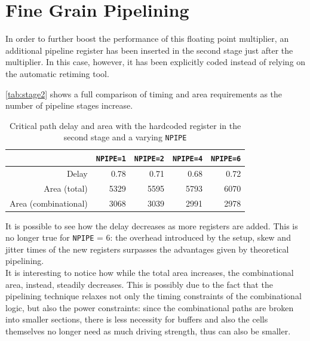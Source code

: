 \section{Fine Grain Pipelining}
In order to further boost the performance of this floating point multiplier, an additional pipeline register has been inserted in the second stage just after the multiplier. In this case, however, it has been explicitly coded instead of relying on the automatic retiming tool.

\autoref{tab:stage2} shows a full comparison of timing and area requirements as the number of pipeline stages increase.
\begin{table}[htbp]
    \centering
	\begin{tabular}{|r|r|r|r|r|}
	\hline
	                        &\texttt{NPIPE=1}  & \texttt{NPIPE=2} & \texttt{NPIPE=4} & \texttt{NPIPE=6}\\\hline
	Delay                   & 0.78             & 0.71             & 0.68             & 0.72 \\\hline
    Area (total)            & 5329             & 5595             & 5793             & 6070 \\\hline
    Area (combinational)    & 3068             & 3039             & 2991             & 2978 \\\hline
	\end{tabular}
	\caption{Critical path delay and area with the hardcoded register in the second stage and a varying \texttt{NPIPE}}
	\label{tab:stage2}
\end{table}
It is possible to see how the delay decreases as more registers are added. This is no longer true for \texttt{NPIPE} = 6: the overhead introduced by the setup, skew and jitter times of the new registers surpasses the advantages given by theoretical pipelining.\\
It is interesting to notice how while the total area increases, the combinational area, instead, steadily decreases. This is possibly due to the fact that the pipelining technique relaxes not only the timing constraints of the combinational logic, but also the power constraints: since the combinational paths are broken into smaller sections, there is less necessity for buffers and also the cells themselves no longer need as much driving strength, thus can also be smaller.


